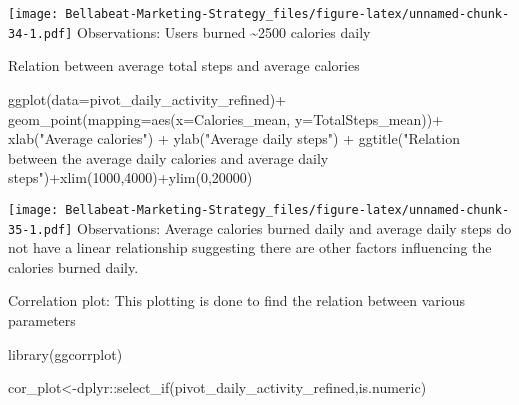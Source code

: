 \documentclass[
]{article}
\newenvironment{Shaded}{\begin{snugshade}}{\end{snugshade}}
\newcommand{\AttributeTok}[1]{\textcolor[rgb]{0.77,0.63,0.00}{#1}}
\newcommand{\DecValTok}[1]{\textcolor[rgb]{0.00,0.00,0.81}{#1}}
\newcommand{\FunctionTok}[1]{\textcolor[rgb]{0.00,0.00,0.00}{#1}}
\newcommand{\NormalTok}[1]{#1}
\newcommand{\OtherTok}[1]{\textcolor[rgb]{0.56,0.35,0.01}{#1}}
\newcommand{\SpecialCharTok}[1]{\textcolor[rgb]{0.00,0.00,0.00}{#1}}
\newcommand{\StringTok}[1]{\textcolor[rgb]{0.31,0.60,0.02}{#1}}
\begin{document}
\texttt{[image: Bellabeat-Marketing-Strategy\_files/figure-latex/unnamed-chunk-34-1.pdf]}
Observations: Users burned \textasciitilde2500 calories daily

Relation between average total steps and average calories

\begin{Shaded}
\begin{Highlighting}[]
\FunctionTok{ggplot}\NormalTok{(}\AttributeTok{data=}\NormalTok{pivot\_daily\_activity\_refined)}\SpecialCharTok{+}
  \FunctionTok{geom\_point}\NormalTok{(}\AttributeTok{mapping=}\FunctionTok{aes}\NormalTok{(}\AttributeTok{x=}\NormalTok{Calories\_mean, }\AttributeTok{y=}\NormalTok{TotalSteps\_mean))}\SpecialCharTok{+}
  \FunctionTok{xlab}\NormalTok{(}\StringTok{"Average calories"}\NormalTok{) }\SpecialCharTok{+} \FunctionTok{ylab}\NormalTok{(}\StringTok{"Average daily steps"}\NormalTok{) }\SpecialCharTok{+} \FunctionTok{ggtitle}\NormalTok{(}\StringTok{"Relation between the average daily calories and average daily steps"}\NormalTok{)}\SpecialCharTok{+}\FunctionTok{xlim}\NormalTok{(}\DecValTok{1000}\NormalTok{,}\DecValTok{4000}\NormalTok{)}\SpecialCharTok{+}\FunctionTok{ylim}\NormalTok{(}\DecValTok{0}\NormalTok{,}\DecValTok{20000}\NormalTok{)}
\end{Highlighting}
\end{Shaded}

\texttt{[image: Bellabeat-Marketing-Strategy\_files/figure-latex/unnamed-chunk-35-1.pdf]}
Observations: Average calories burned daily and average daily steps do
not have a linear relationship suggesting there are other factors
influencing the calories burned daily.

Correlation plot: This plotting is done to find the relation between
various parameters

\begin{Shaded}
\begin{Highlighting}[]
\FunctionTok{library}\NormalTok{(ggcorrplot)}
\end{Highlighting}
\end{Shaded}

\begin{Shaded}
\begin{Highlighting}[]
\NormalTok{cor\_plot}\OtherTok{\textless{}{-}}\NormalTok{dplyr}\SpecialCharTok{::}\FunctionTok{select\_if}\NormalTok{(pivot\_daily\_activity\_refined,is.numeric)}
\end{Highlighting}
\end{Shaded}
\end{document}
